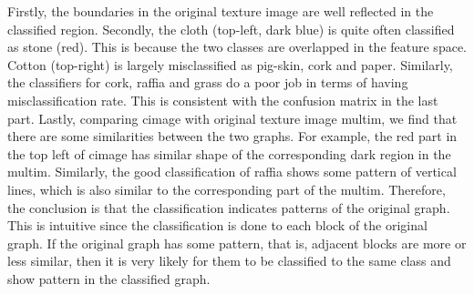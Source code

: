Firstly, the boundaries in the original texture image are well reflected in the classified region. 
Secondly, the cloth (top-left, dark blue) is quite often classified as stone (red). This is because the two classes are overlapped in the feature space. Cotton (top-right) is largely misclassified as pig-skin, cork and paper. Similarly, the classifiers for cork, raffia and grass do a poor job in terms of having misclassification rate. This is consistent with the confusion matrix in the last part.
Lastly, comparing cimage with original texture image multim, we find that there are some similarities between the two graphs. For example, the red part in the top left of cimage has similar shape of the corresponding dark region in the multim. Similarly, the good classification of raffia shows some pattern of vertical lines, which is also similar to the corresponding part of the multim. Therefore, the conclusion is that the classification indicates patterns of the original graph. This is intuitive since the classification is done to each block of the original graph. If the original graph has some pattern, that is, adjacent blocks are more or less similar, then it is very likely for them to be classified to the same class and show pattern in the classified graph.